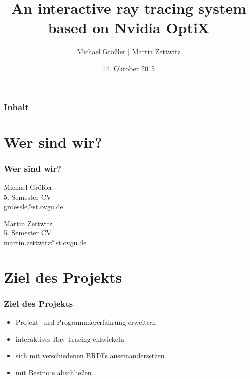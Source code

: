 \documentclass[11pt]{beamer}
\author{Michael Größler | Martin Zettwitz}
\title{An interactive ray tracing system \\ based on Nvidia OptiX}
\date{14. Oktober 2015}
\begin{document}
\begin{frame}
\titlepage
\end{frame}

\begin{frame}
\frametitle{Inhalt} 
\tableofcontents
\end{frame}





\section{Wer sind wir?}
\begin{frame}
\frametitle{Wer sind wir?} 
\begin{center}
Michael Größler \\ {\small 5. Semester CV \\ groessle@st.ovgu.de} 
\parskip 24pt

Martin Zettwitz \\ {\small 5. Semester CV \\ martin.zettwitz@st.ovgu.de}
\end{center}
\end{frame}



\section{Ziel des Projekts}
\begin{frame}
\frametitle{Ziel des Projekts}
\begin{itemize} 
\item Projekt- und Programmiererfahrung erweitern
\item interaktives Ray Tracing entwickeln
\item sich mit verschiedenen BRDFs auseinandersetzen
\item mit Bestnote abschließen
\end{itemize}
\end{frame}
\end{document}
